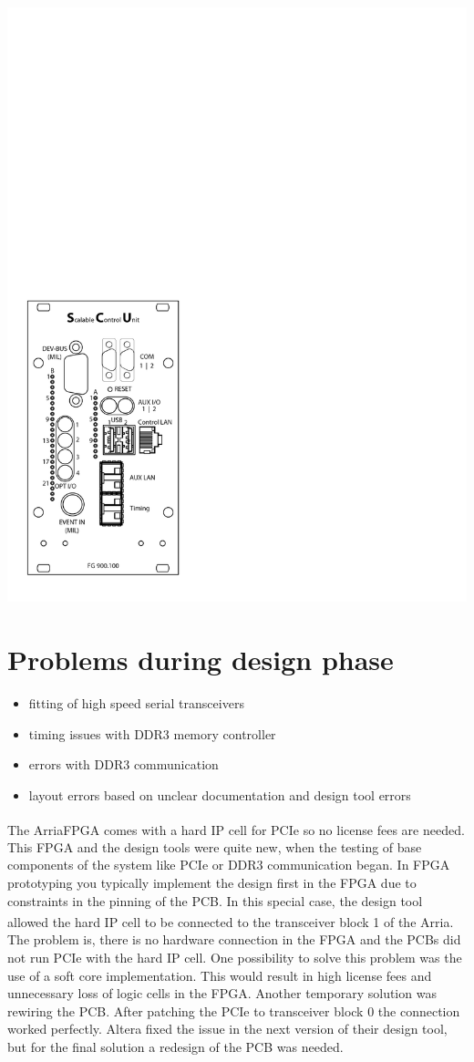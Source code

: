 \documentclass[25pt,halfparskip-,pagesize]{scrartcl}
\def\TTra{\textsuperscript{\texttrademark}}
\begin{document}
\begin{multicols*}{3}


\includegraphics[width=0.6\columnwidth]{../images/WEPMN018f3}


\par

\section{Problems during design phase}
\begin{itemize}
	\item fitting of high speed serial transceivers
	\item timing issues with DDR3 memory controller
	\item errors with DDR3 communication
	\item layout errors based on unclear documentation and design tool errors
\end{itemize}
The Arria\TTra FPGA comes with a hard IP cell for PCIe so no license fees are needed. This FPGA and the design tools were quite new, when the testing of base components of the system like PCIe or DDR3 communication began. In FPGA prototyping you typically implement the design first in the FPGA due to constraints in the pinning of the PCB. In this special case, the design tool allowed the hard IP cell to be connected to the transceiver block 1 of the Arria\TTra. The problem is, there is no hardware connection in the FPGA and the PCBs did not run PCIe with the hard IP cell. One possibility to solve this problem was the use of a soft core implementation. This would result in high license fees and unnecessary loss of logic cells in the FPGA. Another temporary solution was rewiring the PCB. After patching the PCIe to transceiver block 0 the connection worked perfectly. Altera fixed the issue in the next version of their design tool, but for the final solution a redesign of the PCB was needed.


\end{multicols*}
\end{document}
